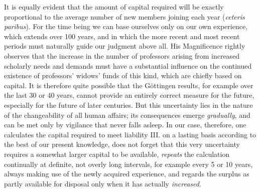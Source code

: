 It is equally evident that the amount of capital required will be exactly proportional to the average number of new members joining each year (\textit{ceteris paribus}). For the time being we can base ourselves only on our own experience, which extends over 100 years, and in which the more recent and most recent periods must naturally guide our judgment above all. His Magnificence rightly observes that the increase in the number of professors arising from increased scholarly needs and demands must have a substantial influence on the continued existence of professors' widows' funds of this kind, which are chiefly based on capital. It is therefore quite possible that the Göttingen results, for example over the last 30 or 40 years, cannot provide an entirely correct measure for the future, especially for the future of later centuries. But this uncertainty lies in the nature of the changeability of all human affairs; its consequences emerge \textit{gradually}, and can be met only by vigilance that never falls asleep. In our case, therefore, one calculates the capital required to meet liability III. on a lasting basis according to the best of our present knowledge, does not forget that this very uncertainty requires a somewhat larger capital to be available, \textit{repeats} the calculation continually at definite, not overly long
intervals, for example every 5 or 10 years, always making use of the newly acquired experience, and regards the surplus as partly available for disposal only when it has actually \textit{increased}.

